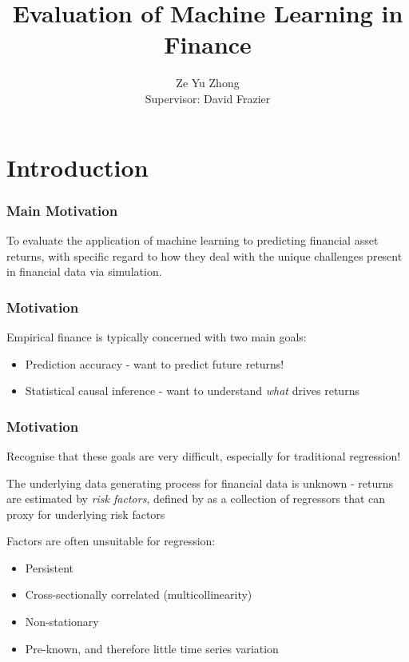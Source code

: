 \documentclass[aspectratio=169]{beamer}
\title{Evaluation of Machine Learning in Finance}
\author{Ze Yu Zhong 
	\\ Supervisor: David Frazier}
\institute{Monash University}
\date{}
\begin{document}
	
\begin{frame}[plain]
    \maketitle
\end{frame}

\section{Introduction}


\begin{frame}
\frametitle{Main Motivation}
To evaluate the application of machine learning to predicting financial asset returns, with specific regard to how they deal with the unique challenges present in financial data via simulation.
\end{frame}

\begin{frame}
\frametitle{Motivation}
Empirical finance is typically concerned with two main goals:
\begin{itemize}
	\item Prediction accuracy - want to predict future returns!
	\item Statistical causal inference - want to understand \textit{what} drives returns
\end{itemize}
\end{frame}

\begin{frame}
\frametitle{Motivation}
Recognise that these goals are very difficult, especially for traditional regression!

The underlying data generating process for financial data is unknown - returns are estimated by \textit{risk factors}, defined by \cite{harvey__2016} as a collection of regressors that can proxy for underlying risk factors

Factors are often unsuitable for regression:
\begin{itemize}
	\item Persistent
	\item Cross-sectionally correlated (multicollinearity)
	\item Non-stationary
	\item Pre-known, and therefore little time series variation
\end{itemize}
\end{frame}
\end{document}
